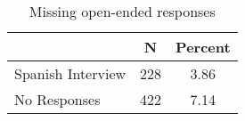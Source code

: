\begin{table}[ht]
\centering
\begin{tabular}{lcc}
  \hline
 & N & Percent \\ 
  \hline
Spanish Interview & 228 & 3.86 \\ 
  No Responses & 422 & 7.14 \\ 
   \hline
\end{tabular}
\caption{Missing open-ended responses} 
\label{tab:app_mis}
\end{table}
